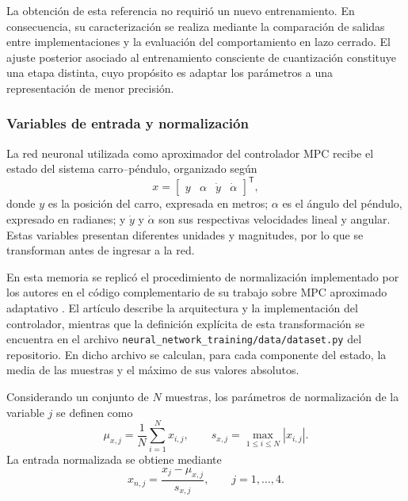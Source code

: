 La obtención de esta referencia no requirió un nuevo entrenamiento. En consecuencia, su caracterización se realiza mediante la comparación de salidas entre implementaciones y la evaluación del comportamiento en lazo cerrado. El ajuste posterior asociado al entrenamiento consciente de cuantización constituye una etapa distinta, cuyo propósito es adaptar los parámetros a una representación de menor precisión.

\subsubsection{Variables de entrada y normalización}
\label{sec:mpc_normalizacion}

La red neuronal utilizada como aproximador del controlador MPC recibe
el estado del sistema carro--péndulo, organizado según
\begin{equation}
    x =
    \begin{bmatrix}
        y & \alpha & \dot{y} & \dot{\alpha}
    \end{bmatrix}^{\mathsf T},
\end{equation}
donde $y$ es la posición del carro, expresada en metros;
$\alpha$ es el ángulo del péndulo, expresado en radianes;
y $\dot{y}$ y $\dot{\alpha}$ son sus respectivas velocidades
lineal y angular. Estas variables presentan diferentes unidades y
magnitudes, por lo que se transforman antes de ingresar a la red.

En esta memoria se replicó el procedimiento de normalización
implementado por los autores en el código complementario de su trabajo
sobre MPC aproximado adaptativo \cite{hose2024,hoserepo}.
El artículo describe la arquitectura y la implementación del
controlador, mientras que la definición explícita de esta
transformación se encuentra en el archivo
\texttt{neural\_network\_training/data/dataset.py} del repositorio.
En dicho archivo se calculan, para cada componente del estado, la
media de las muestras y el máximo de sus valores absolutos.

Considerando un conjunto de $N$ muestras, los parámetros de
normalización de la variable $j$ se definen como
\begin{equation}
    \mu_{x,j} = \frac{1}{N}\sum_{i=1}^{N}x_{i,j},
    \qquad
    s_{x,j} = \max_{1\leq i\leq N}|x_{i,j}|.
\end{equation}
La entrada normalizada se obtiene mediante
\begin{equation}
    x_{n,j} = \frac{x_j-\mu_{x,j}}{s_{x,j}},
    \qquad j=1,\ldots,4.
    \label{eq:normalizacion_estado_mpc}
\end{equation}

